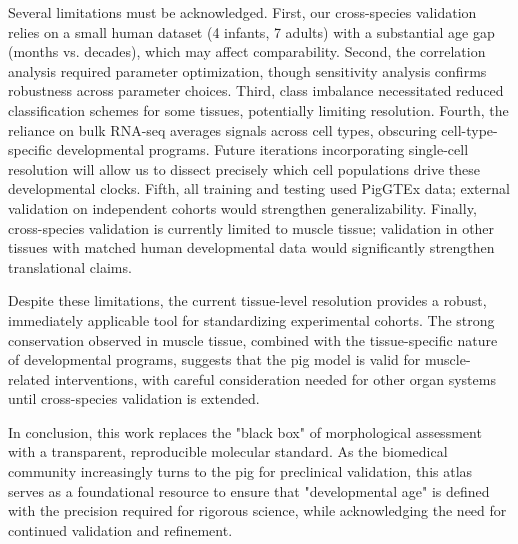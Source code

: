 Several limitations must be acknowledged. First, our cross-species validation relies on a small human dataset (4 infants, 7 adults) with a substantial age gap (months vs. decades), which may affect comparability. Second, the correlation analysis required parameter optimization, though sensitivity analysis confirms robustness across parameter choices. Third, class imbalance necessitated reduced classification schemes for some tissues, potentially limiting resolution. Fourth, the reliance on bulk RNA-seq averages signals across cell types, obscuring cell-type-specific developmental programs. Future iterations incorporating single-cell resolution will allow us to dissect precisely which cell populations drive these developmental clocks. Fifth, all training and testing used PigGTEx data; external validation on independent cohorts would strengthen generalizability. Finally, cross-species validation is currently limited to muscle tissue; validation in other tissues with matched human developmental data would significantly strengthen translational claims.

Despite these limitations, the current tissue-level resolution provides a robust, immediately applicable tool for standardizing experimental cohorts. The strong conservation observed in muscle tissue, combined with the tissue-specific nature of developmental programs, suggests that the pig model is valid for muscle-related interventions, with careful consideration needed for other organ systems until cross-species validation is extended.

In conclusion, this work replaces the "black box" of morphological assessment with a transparent, reproducible molecular standard. As the biomedical community increasingly turns to the pig for preclinical validation, this atlas serves as a foundational resource to ensure that "developmental age" is defined with the precision required for rigorous science, while acknowledging the need for continued validation and refinement.